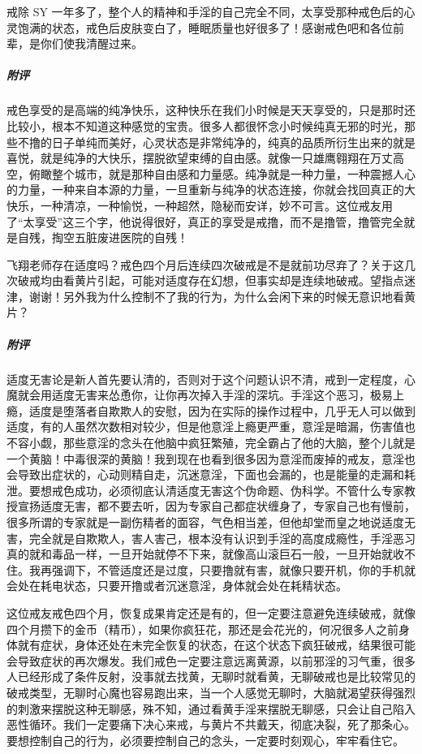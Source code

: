 \begin{case}
    戒除 SY 一年多了，整个人的精神和手淫的自己完全不同，太享受那种戒色后的心灵饱满的状态，戒色后皮肤变白了，睡眠质量也好很多了！感谢戒色吧和各位前辈，是你们使我清醒过来。
    \subparagraph{附评} 戒色享受的是高端的纯净快乐，这种快乐在我们小时候是天天享受的，只是那时还比较小，根本不知道这种感觉的宝贵。很多人都很怀念小时候纯真无邪的时光，那些不撸的日子单纯而美好，心灵状态是非常纯净的，纯真的品质所衍生出来的就是喜悦，就是纯净的大快乐，摆脱欲望束缚的自由感。就像一只雄鹰翱翔在万丈高空，俯瞰整个城市，就是那种自由感和力量感。纯净就是一种力量，一种震撼人心的力量，一种来自本源的力量，一旦重新与纯净的状态连接，你就会找回真正的大快乐，一种清凉，一种愉悦，一种超然，隐秘而安详，妙不可言。这位戒友用了“太享受”这三个字，他说得很好，真正的享受是戒撸，而不是撸管，撸管完全就是自残，掏空五脏废进医院的自残！
\end{case}

\begin{case}
    飞翔老师存在适度吗？戒色四个月后连续四次破戒是不是就前功尽弃了？关于这几次破戒均由看黄片引起，可能对适度存在幻想，但事实却是连续地破戒。望指点迷津，谢谢！另外我为什么控制不了我的行为，为什么会闲下来的时候无意识地看黄片？
    \subparagraph{附评} 适度无害论是新人首先要认清的，否则对于这个问题认识不清，戒到一定程度，心魔就会用适度无害来怂恿你，让你再次掉入手淫的深坑。手淫这个恶习，极易上瘾，适度是堕落者自欺欺人的安慰，因为在实际的操作过程中，几乎无人可以做到适度，有的人虽然次数相对较少，但是他意淫上瘾更严重，意淫是暗漏，伤害值也不容小觑，那些意淫的念头在他脑中疯狂繁殖，完全霸占了他的大脑，整个儿就是一个黄脑！中毒很深的黄脑！我到现在也看到很多因为意淫而废掉的戒友，意淫也会导致出症状的，心动则精自走，沉迷意淫，下面也会漏的，也是能量的走漏和耗泄。要想戒色成功，必须彻底认清适度无害这个伪命题、伪科学。不管什么专家教授宣扬适度无害，都不要去听，因为专家自己都症状缠身了，专家自己也有慢前，很多所谓的专家就是一副伤精者的面容，气色相当差，但他却堂而皇之地说适度无害，完全就是自欺欺人，害人害己，根本没有认识到手淫的高度成瘾性，手淫恶习真的就和毒品一样，一旦开始就停不下来，就像高山滚巨石一般，一旦开始就收不住。我再强调下，不管适度还是过度，只要撸就有害，就像只要开机，你的手机就会处在耗电状态，只要开撸或者沉迷意淫，身体就会处在耗精状态。

    这位戒友戒色四个月，恢复成果肯定还是有的，但一定要注意避免连续破戒，就像四个月攒下的金币（精币），如果你疯狂花，那还是会花光的，何况很多人之前身体就有症状，身体还处在未完全恢复的状态，在这个状态下疯狂破戒，结果很可能会导致症状的再次爆发。我们戒色一定要注意远离黄源，以前邪淫的习气重，很多人已经形成了条件反射，没事就去找黄，无聊时就看黄，无聊破戒也是比较常见的破戒类型，无聊时心魔也容易跑出来，当一个人感觉无聊时，大脑就渴望获得强烈的刺激来摆脱这种无聊感，殊不知，通过看黄手淫来摆脱无聊感，只会让自己陷入恶性循环。我们一定要痛下决心来戒，与黄片不共戴天，彻底决裂，死了那条心。要想控制自己的行为，必须要控制自己的念头，一定要时刻观心，牢牢看住它。
\end{case}

